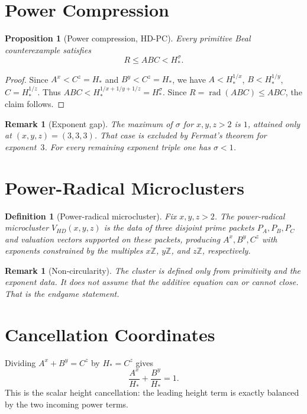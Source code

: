 \documentclass[11pt,a4paper]{article}
\DeclareMathOperator{\rad}{rad}
\newtheorem{proposition}[theorem]{Proposition}
\newtheorem{definition}[theorem]{Definition}
\newtheorem{remark}[theorem]{Remark}
\begin{document}
\section{Power Compression}

\begin{proposition}[Power compression, HD-PC]
\label{prop:compression}
Every primitive Beal counterexample satisfies
\[
  R \le ABC < H_*^{\sigma}.
\]
\end{proposition}

\begin{proof}
Since $A^x < C^z=H_*$ and $B^y < C^z=H_*$, we have
$A < H_*^{1/x}$, $B < H_*^{1/y}$, $C=H_*^{1/z}$. Thus
$ABC < H_*^{1/x+1/y+1/z}=H_*^{\sigma}$. Since $R=\rad(ABC)\le ABC$,
the claim follows.
\end{proof}

\begin{remark}[Exponent gap]
The maximum of $\sigma$ for $x,y,z>2$ is $1$, attained only at
$(x,y,z)=(3,3,3)$. That case is excluded by Fermat's theorem for
exponent~$3$. For every remaining exponent triple one has $\sigma<1$.
\end{remark}

\section{Power-Radical Microclusters}

\begin{definition}[Power-radical microcluster]
Fix $x,y,z>2$. The power-radical microcluster $V_{HD}(x,y,z)$ is the
data of three disjoint prime packets $P_A, P_B, P_C$ and valuation
vectors supported on these packets, producing $A^x, B^y, C^z$ with
exponents constrained by the multiples $x\mathbb Z$, $y\mathbb Z$, and
$z\mathbb Z$, respectively.
\end{definition}

\begin{remark}[Non-circularity]
The cluster is defined only from primitivity and the exponent data.
It does not assume that the additive equation can or cannot close.
That is the endgame statement.
\end{remark}

\section{Cancellation Coordinates}

Dividing $A^x+B^y=C^z$ by $H_*=C^z$ gives
\[
  \frac{A^x}{H_*}+\frac{B^y}{H_*}=1.
\]
This is the scalar height cancellation: the leading height term is
exactly balanced by the two incoming power terms.
\end{document}
